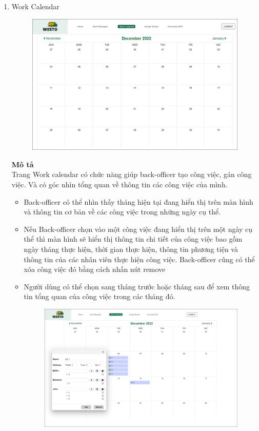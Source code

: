 \documentclass[a4paper]{article}
\begin{document}
\begin{enumerate}
    \item Work Calendar\\
    \newpage
        \begin{figure}[!h]
    \begin{center}
      \includegraphics[width=5in]{Image/calendar.png}
    \end{center}
    \end{figure}
    \textbf{Mô tả}\\
    Trang Work calendar có chức năng giúp back-officer tạo công việc, gán công việc. Và có góc nhìn tổng quan về thông tin các công việc của mình.
    \begin{itemize}
        \item Back-officer có thể nhìn thấy tháng hiện tại đang hiển thị trên màn hình và thông tin cơ bản về các công việc trong những ngày cụ thể.
        \item Nếu Back-officer chọn vào một công việc đang hiển thị trên một ngày cụ thể thì màn hình sẽ hiển thị thông tin chi tiết của công việc bao gồm ngày tháng thực hiện, thời gian thực hiện, thông tin phương tiện và thông tin của các nhân viên thực hiện công việc. Back-officer cũng có thể xóa công việc đó bằng cách nhấn nút remove
        \item Người dùng có thể chọn sang tháng trước hoặc tháng sau để xem thông tin tổng quan của công việc trong các tháng đó.
                \\
                \begin{figure}[!h]
    \begin{center}
      \includegraphics[width=5in]{Image/workCalendarInformation.png}

\end{center}
\end{figure}
\end{itemize}
\end{enumerate}
\end{document}
